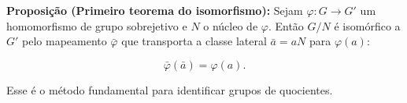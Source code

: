 \documentclass[a4paper,12pt]{report}
\theoremstyle{plain}
\theoremstyle{definition}
\begin{document}
\textbf{Proposição (Primeiro teorema do isomorfismo):} Sejam
\(\varphi:G \longrightarrow G'\) um homomorfismo de grupo sobrejetivo e
\(N\) o núcleo de \(\varphi\). Então \(G/N\) é isomórfico a \(G'\) pelo
mapeamento \(\bar\varphi\) que transporta a classe lateral \(\bar a = aN\)
para \(\varphi(a)\):

\[\bar\varphi(\bar a) = \varphi(a).\]

Esse é o método fundamental para identificar grupos de quocientes.


{}



\end{document}
